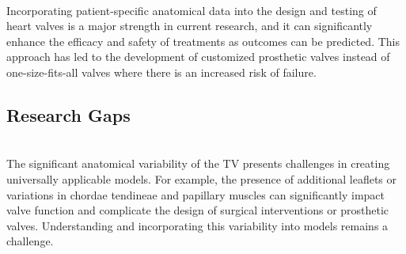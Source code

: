 \\
Incorporating patient-specific anatomical data into the design and testing of heart valves is a major strength in current research, and it can significantly enhance the efficacy and safety of treatments as outcomes can be predicted. This approach has led to the development of customized prosthetic valves instead of one-size-fits-all valves where there is an increased risk of failure.~




\subsection{Research Gaps}

\\
The significant anatomical variability of the \gls{TV} presents challenges in creating universally applicable models. For example, the presence of additional leaflets or variations in chordae tendineae and papillary muscles can significantly impact valve function and complicate the design of surgical interventions or prosthetic valves. Understanding and incorporating this variability into models remains a challenge.~

